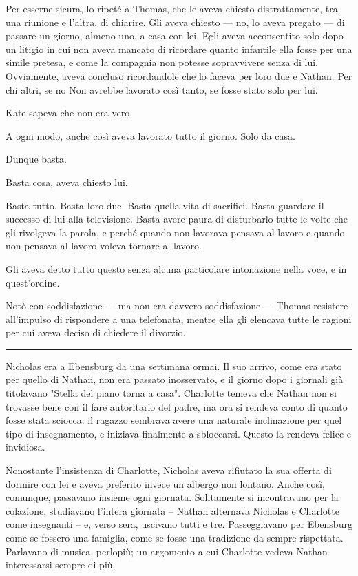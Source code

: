 \documentclass[a4paper,oneside,11pt]{memoir}
\begin{document}
Per esserne sicura, lo ripeté a Thomas, che le aveva chiesto distrattamente, tra una riunione e
l'altra, di chiarire. Gli aveva chiesto — no, lo aveva pregato — di passare un giorno, almeno uno, a
casa con lei. Egli aveva acconsentito solo dopo un litigio in cui non aveva mancato di ricordare
quanto infantile ella fosse per una simile pretesa, e come la compagnia non potesse sopravvivere
senza di lui. Ovviamente, aveva concluso ricordandole che lo faceva per loro due e Nathan. Per chi
altri, se no Non avrebbe lavorato così tanto, se fosse stato solo per lui.

Kate sapeva che non era vero.

A ogni modo, anche così aveva lavorato tutto il giorno. Solo da casa.

Dunque basta.

Basta cosa, aveva chiesto lui.

Basta tutto. Basta loro due. Basta quella vita di sacrifici. Basta guardare il successo di lui alla
televisione. Basta avere paura di disturbarlo tutte le volte che gli rivolgeva la parola, e perché
quando non lavorava pensava al lavoro e quando non pensava al lavoro voleva tornare al lavoro.

Gli aveva detto tutto questo senza alcuna particolare intonazione nella voce, e in quest'ordine.

Notò con soddisfazione — ma non era davvero soddisfazione — Thomas resistere all'impulso di
rispondere a una telefonata, mentre ella gli elencava tutte le ragioni per cui aveva deciso di
chiedere il divorzio.

\plainbreak{1}

Nicholas era a Ebensburg da una settimana ormai. Il suo arrivo, come era stato per quello di
Nathan, non era passato inosservato, e il giorno dopo i giornali già titolavano "Stella del
piano torna a casa". Charlotte temeva che Nathan non si trovasse bene con il fare autoritario del
padre, ma ora si rendeva conto di quanto fosse stata sciocca: il ragazzo sembrava avere una naturale
inclinazione per quel tipo di insegnamento, e iniziava finalmente a sbloccarsi. Questo la rendeva
felice e invidiosa.

Nonostante l'insistenza di Charlotte, Nicholas aveva rifiutato la sua offerta di dormire con lei e
aveva preferito invece un albergo non lontano. Anche così, comunque, passavano insieme ogni
giornata. Solitamente si incontravano per la colazione, studiavano l'intera giornata -- Nathan
alternava Nicholas e Charlotte come insegnanti -- e, verso sera, uscivano tutti e tre. Passeggiavano
per Ebensburg come se fossero una famiglia, come se fosse una tradizione da sempre rispettata.
Parlavano di musica, perlopiù; un argomento a cui Charlotte vedeva Nathan interessarsi sempre di
più.
\end{document}
